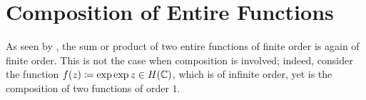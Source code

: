 \chapter{Composition of Entire Functions}
\label{ch:composition-entire-functions}

As seen by , the sum or product of two entire functions of finite order is again of finite order. This is not the case when composition is involved; indeed, consider the function $f(z) \coloneqq \exp \exp z \in H(\mathbb{C})$, which is of infinite order, yet is the composition of two functions of order $1$. 

